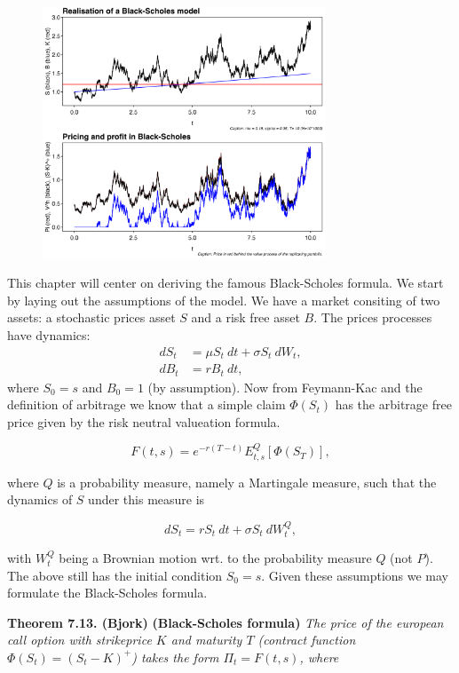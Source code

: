 \documentclass[a4paper,12pt,openany]{book}
\begin{document}
\begin{figure}[H]
  \begin{center}
    \includegraphics[width=0.75\textwidth]{figures/BS_sim.png}
  \end{center}
\end{figure}

This chapter will center on deriving the famous Black-Scholes formula. We start by laying out the assumptions of the model. We have a market consiting of two assets: a stochastic prices asset \(S\) and a risk free asset \(B\). The prices processes have dynamics:
\begin{align*}
dS_t&=\mu S_t\ dt+\sigma S_t\ dW_t,\tag{7.45}\\
dB_t&=r B_t\ dt,\tag{7.44}
\end{align*}
where \(S_0=s\) and \(B_0=1\) (by assumption). Now from Feymann-Kac and the definition of arbitrage we know that a simple claim \(\Phi(S_t)\) has the arbitrage free price given by the risk neutral valueation formula.

\[
F(t,s)=e^{-r(T-t)}E^Q_{t,s}[\Phi(S_T)],\tag{7.46}
\]

where \(Q\) is a probability measure, namely a Martingale measure, such that the dynamics of \(S\) under this measure is

\[
dS_t=r S_t\ dt+\sigma S_t\ dW^Q_t,\tag{7.47}
\]

with \(W_t^Q\) being a Brownian motion wrt. to the probability measure \(Q\) (not \(P\)). The above still has the initial condition \(S_0=s\). Given these assumptions we may formulate the Black-Scholes formula.

\textbf{Theorem 7.13. (Bjork)} \textbf{(Black-Scholes formula)} \emph{The price of the european call option with strikeprice \(K\) and maturity \(T\) (contract function \(\Phi(S_t)=\left( S_t - K\right)^+\)) takes the form \(\Pi_t=F(t,s)\), where}
\end{document}
